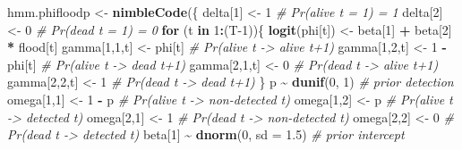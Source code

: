 \documentclass[
  12pt,
]{krantz}
\newenvironment{Shaded}{\begin{snugshade}}{\end{snugshade}}
\newcommand{\AttributeTok}[1]{\textcolor[rgb]{0.13,0.29,0.53}{#1}}
\newcommand{\CommentTok}[1]{\textcolor[rgb]{0.56,0.35,0.01}{\textit{#1}}}
\newcommand{\ControlFlowTok}[1]{\textcolor[rgb]{0.13,0.29,0.53}{\textbf{#1}}}
\newcommand{\DecValTok}[1]{\textcolor[rgb]{0.00,0.00,0.81}{#1}}
\newcommand{\FloatTok}[1]{\textcolor[rgb]{0.00,0.00,0.81}{#1}}
\newcommand{\FunctionTok}[1]{\textcolor[rgb]{0.13,0.29,0.53}{\textbf{#1}}}
\newcommand{\NormalTok}[1]{#1}
\newcommand{\OtherTok}[1]{\textcolor[rgb]{0.56,0.35,0.01}{#1}}
\newcommand{\SpecialCharTok}[1]{\textcolor[rgb]{0.81,0.36,0.00}{\textbf{#1}}}
\begin{document}
\begin{Shaded}
\begin{Highlighting}[]
\NormalTok{hmm.phifloodp }\OtherTok{\textless{}{-}} \FunctionTok{nimbleCode}\NormalTok{(\{}
\NormalTok{  delta[}\DecValTok{1}\NormalTok{] }\OtherTok{\textless{}{-}} \DecValTok{1}          \CommentTok{\# Pr(alive t = 1) = 1}
\NormalTok{  delta[}\DecValTok{2}\NormalTok{] }\OtherTok{\textless{}{-}} \DecValTok{0}          \CommentTok{\# Pr(dead t = 1) = 0}
  \ControlFlowTok{for}\NormalTok{ (t }\ControlFlowTok{in} \DecValTok{1}\SpecialCharTok{:}\NormalTok{(T}\DecValTok{{-}1}\NormalTok{))\{}
    \FunctionTok{logit}\NormalTok{(phi[t]) }\OtherTok{\textless{}{-}}\NormalTok{ beta[}\DecValTok{1}\NormalTok{] }\SpecialCharTok{+}\NormalTok{ beta[}\DecValTok{2}\NormalTok{] }\SpecialCharTok{*}\NormalTok{ flood[t]}
\NormalTok{    gamma[}\DecValTok{1}\NormalTok{,}\DecValTok{1}\NormalTok{,t] }\OtherTok{\textless{}{-}}\NormalTok{ phi[t]      }\CommentTok{\# Pr(alive t {-}\textgreater{} alive t+1)}
\NormalTok{    gamma[}\DecValTok{1}\NormalTok{,}\DecValTok{2}\NormalTok{,t] }\OtherTok{\textless{}{-}} \DecValTok{1} \SpecialCharTok{{-}}\NormalTok{ phi[t]  }\CommentTok{\# Pr(alive t {-}\textgreater{} dead t+1)}
\NormalTok{    gamma[}\DecValTok{2}\NormalTok{,}\DecValTok{1}\NormalTok{,t] }\OtherTok{\textless{}{-}} \DecValTok{0}        \CommentTok{\# Pr(dead t {-}\textgreater{} alive t+1)}
\NormalTok{    gamma[}\DecValTok{2}\NormalTok{,}\DecValTok{2}\NormalTok{,t] }\OtherTok{\textless{}{-}} \DecValTok{1}        \CommentTok{\# Pr(dead t {-}\textgreater{} dead t+1)}
\NormalTok{  \}}
\NormalTok{  p }\SpecialCharTok{\textasciitilde{}} \FunctionTok{dunif}\NormalTok{(}\DecValTok{0}\NormalTok{, }\DecValTok{1}\NormalTok{) }\CommentTok{\# prior detection}
\NormalTok{  omega[}\DecValTok{1}\NormalTok{,}\DecValTok{1}\NormalTok{] }\OtherTok{\textless{}{-}} \DecValTok{1} \SpecialCharTok{{-}}\NormalTok{ p    }\CommentTok{\# Pr(alive t {-}\textgreater{} non{-}detected t)}
\NormalTok{  omega[}\DecValTok{1}\NormalTok{,}\DecValTok{2}\NormalTok{] }\OtherTok{\textless{}{-}}\NormalTok{ p        }\CommentTok{\# Pr(alive t {-}\textgreater{} detected t)}
\NormalTok{  omega[}\DecValTok{2}\NormalTok{,}\DecValTok{1}\NormalTok{] }\OtherTok{\textless{}{-}} \DecValTok{1}        \CommentTok{\# Pr(dead t {-}\textgreater{} non{-}detected t)}
\NormalTok{  omega[}\DecValTok{2}\NormalTok{,}\DecValTok{2}\NormalTok{] }\OtherTok{\textless{}{-}} \DecValTok{0}        \CommentTok{\# Pr(dead t {-}\textgreater{} detected t)}
\NormalTok{  beta[}\DecValTok{1}\NormalTok{] }\SpecialCharTok{\textasciitilde{}} \FunctionTok{dnorm}\NormalTok{(}\DecValTok{0}\NormalTok{, }\AttributeTok{sd =} \FloatTok{1.5}\NormalTok{) }\CommentTok{\# prior intercept}

\end{Highlighting}
\end{Shaded}
\end{document}
